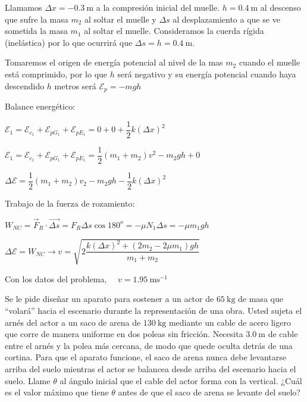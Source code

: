 Llamamos $\Delta x=-0.3\ \mathrm{m}$ a la compresión inicial del muelle. $h=0.4\ \mathrm{m}$ al descenso que sufre la masa $m_2$ al soltar el muelle y $\Delta s$ al desplazamiento a que se ve sometida  la masa $m_1$ al soltar el muelle. Consideramos la cuerda rígida (inelástica) por lo que ocurrirá que $\Delta s=h=0.4\ \mathrm{m}$.

Tomaremos el origen de energía potencial al nivel de la mas $m_2$ cuando el muelle está comprimido, por lo que $h$ será negativo y su energía potencial cuando haya descendido $h$ metros será $\mathcal E_p=-mgh$

Balance energético:

$\mathcal E_1=\mathcal E_{c_1}+\mathcal E_{pG_1}+\mathcal E_{pE_1}=0+0+\dfrac 1 2 k (\Delta x)^2$

$\mathcal E_1=\mathcal E_{c_1}+\mathcal E_{pG_1}+\mathcal E_{pE_1}=\dfrac 1 2 (m_1+m_2)v^2-m_2gh+0$

$\Delta \mathcal E=\dfrac 1 2 (m_1+m_2)v_2-m_2gh-\dfrac 1 2 k (\Delta x)^2$

Trabajo de la fuerza de rozamiento:

$W_{NC}=\vec F_R \cdot \overrightarrow{\Delta s}=F_R \Delta s \cos 180^o =-\mu N_1 \Delta s=-\mu m_1 g h$

 $\Delta \mathcal E=W_{NC} \to v=\sqrt{2 \dfrac{k(\Delta x)^2+(2m_2-2\mu m_1) gh}{m_1+m_2}}$
 
 Con los datos del problema, $\quad v=1.95\ \mathrm{ms}^{-1}$

\vspace{15mm} %
\begin{prob}
Se le pide diseñar un aparato para sostener a un actor de $65 \ \mathrm{kg}$ de masa que ``volará'' hacia el escenario durante la representación de una obra. Usted sujeta el arnés del actor a un saco de arena de $130 \ \mathrm{kg}$ mediante un cable de acero ligero que corre de manera uniforme en dos poleas sin fricción. Necesita $3.0 \ \mathrm{m}$ de cable entre el arnés y la polea más cercana, de modo que quede oculta detrás de una cortina. Para que el aparato funcione, el saco de arena nunca debe levantarse arriba del suelo mientras el actor se balancea desde arriba del escenario hacia el suelo. Llame $\theta$ al ángulo inicial que el cable del actor forma con la vertical. ¿Cuál es el valor máximo que tiene $\theta$ antes de que el saco de arena se levante del suelo?	
\end{prob}



